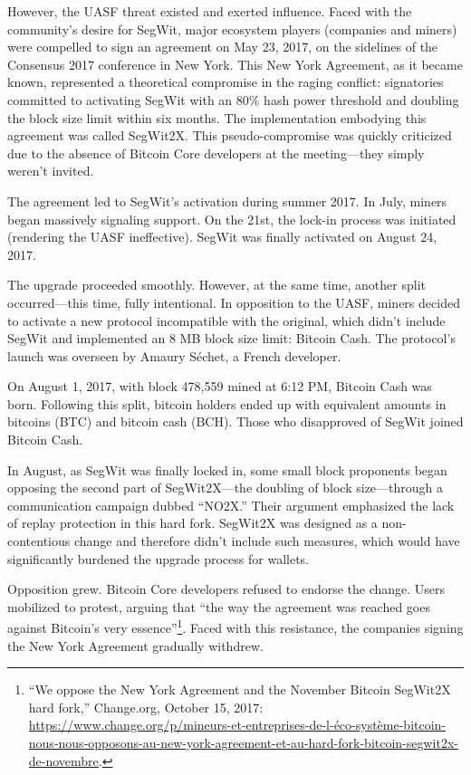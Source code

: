 \documentclass[
  a5paper,
  smalldemyvopaper,10pt,twoside,onecolumn,openright,extrafontsizes,hidelinks]{memoir}
\begin{document}
However, the UASF threat existed and exerted influence. Faced with the
community's desire for SegWit, major ecosystem players (companies and
miners) were compelled to sign an agreement on May 23, 2017, on the
sidelines of the Consensus 2017 conference in New York. This New York
Agreement, as it became known, represented a theoretical compromise in
the raging conflict: signatories committed to activating SegWit with an
80\% hash power threshold and doubling the block size limit within six
months. The implementation embodying this agreement was called SegWit2X.
This pseudo-compromise was quickly criticized due to the absence of
Bitcoin Core developers at the meeting---they simply weren't invited.

The agreement led to SegWit's activation during summer 2017. In July,
miners began massively signaling support. On the 21st, the lock-in
process was initiated (rendering the UASF ineffective). SegWit was
finally activated on August 24, 2017.

The upgrade proceeded smoothly. However, at the same time, another split
occurred---this time, fully intentional. In opposition to the UASF,
miners decided to activate a new protocol incompatible with the
original, which didn't include SegWit and implemented an 8 MB block size
limit: Bitcoin Cash. The protocol's launch was overseen by Amaury
Séchet, a French developer.

On August 1, 2017, with block 478,559 mined at 6:12 PM, Bitcoin Cash was
born. Following this split, bitcoin holders ended up with equivalent
amounts in bitcoins (BTC) and bitcoin cash (BCH). Those who disapproved
of SegWit joined Bitcoin Cash.

In August, as SegWit was finally locked in, some small block proponents
began opposing the second part of SegWit2X---the doubling of block
size---through a communication campaign dubbed ``NO2X.'' Their argument
emphasized the lack of replay protection in this hard fork. SegWit2X was
designed as a non-contentious change and therefore didn't include such
measures, which would have significantly burdened the upgrade process
for wallets.

Opposition grew. Bitcoin Core developers refused to endorse the change.
Users mobilized to protest, arguing that ``the way the agreement was
reached goes against Bitcoin's very essence''\footnote{``We oppose the
  New York Agreement and the November Bitcoin SegWit2X hard fork,''
  Change.org, October 15, 2017:
  \url{https://www.change.org/p/mineurs-et-entreprises-de-l-éco-système-bitcoin-nous-nous-opposons-au-new-york-agreement-et-au-hard-fork-bitcoin-segwit2x-de-novembre}.}.
Faced with this resistance, the companies signing the New York Agreement
gradually withdrew.
\end{document}

